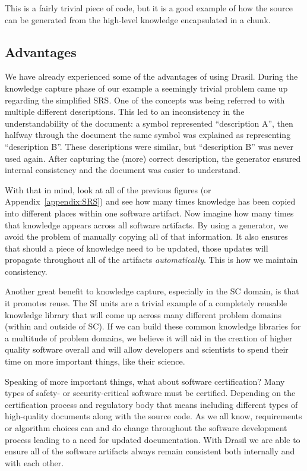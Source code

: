 \documentclass[preprint, 10pt]{sigplanconf}
\begin{document}
This is a fairly trivial piece of code, but it is a good example of how the
source can be generated from the high-level knowledge encapsulated in a chunk.

\subsection{Advantages}
\label{subsec:advantages}

We have already experienced some of the advantages of using Drasil. During the
knowledge capture phase of our example a seemingly trivial problem came up
regarding the simplified SRS. One of the concepts was being referred to with
multiple different descriptions. This led to an inconsistency in the
understandability of the document: a symbol represented ``description A'', then
halfway through the document the same symbol was explained as representing
``description B''. These descriptions were similar, but ``description B'' was
never used again. After capturing the (more) correct description, the generator
ensured internal consistency and the document was easier to understand. %

With that in mind, look at all of the previous figures (or
Appendix~\ref{appendix:SRS}) and see how many times knowledge has been copied into
different places within one software artifact. Now imagine how many times that
knowledge appears across all software artifacts. By using a generator, we avoid
the problem of manually copying all of that information. It also ensures
that should a piece of knowledge need to be updated, those updates will
propagate throughout all of the artifacts \emph{automatically}.  This is how we
maintain consistency.
	
Another great benefit to knowledge capture, especially in the SC domain, is that
it promotes reuse. The SI units are a trivial example of a completely reusable
knowledge library that will come up across many different problem domains
(within and outside of SC). If we can build these common knowledge libraries for
a multitude of problem domains, we believe it will aid in the creation of higher
quality software overall and will allow developers and scientists to spend their
time on more important things, like their science.

Speaking of more important things, what about software certification? Many types
of safety- or security-critical software must be certified. Depending on the
certification process and regulatory body that means including different types
of high-quality documents along with the source code. As we all know,
requirements or algorithm choices can and do change throughout the software
development process leading to a need for updated documentation. With Drasil we
are able to ensure all of the software artifacts always remain consistent both
internally and with each other. %
\end{document}

